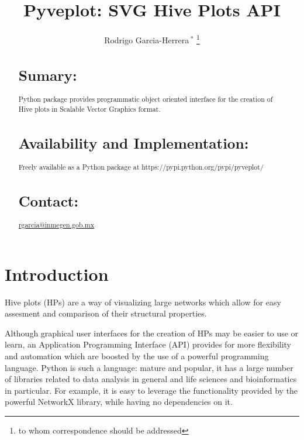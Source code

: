 \documentclass{bioinfo}
\begin{document}

\title[short Title]{Pyveplot: SVG Hive Plots API}
\author[]{Rodrigo Garcia-Herrera\,$^{*}$ \footnote{to whom correspondence should be addressed}}
\address{Department of Bioinformatics, Mexican Institute of Genomic Medicine}



\maketitle

\begin{abstract}

\section{Sumary:}
Python package provides programmatic object oriented interface for the
creation of Hive plots in Scalable Vector Graphics format.
\section{Availability and Implementation:}
Freely available as a Python package at
https://pypi.python.org/pypi/pyveplot/

\section{Contact:} \href{rgarcia@inmegen.gob.mx}{rgarcia@inmegen.gob.mx}
\end{abstract}

\section{Introduction}

Hive plots (HPs) are a way of visualizing large networks which allow
for easy assesment and comparison of their structural properties.
\cite{krzywinski2012hive}

Although graphical user interfaces for the creation of HPs may be
easier to use or learn, an Application Programming Interface (API)
provides for more flexibility and automation which are boosted by the
use of a powerful programming language. Python is such a language:
mature and popular, it has a large number of libraries related to data
analysis in general and life sciences and bioinformatics in
particular. For example, it is easy to leverage the functionality
provided by the powerful NetworkX
library\cite{hagberg-2008-exploring}, while having no dependencies on
it.
\end{document}
